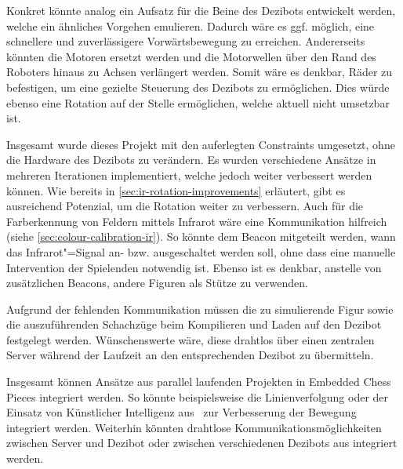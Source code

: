 
Konkret könnte analog ein Aufsatz für die Beine des Dezibots entwickelt werden, welche ein ähnliches Vorgehen emulieren. Dadurch wäre es ggf. möglich, eine schnellere und zuverlässigere Vorwärtsbewegung zu erreichen. Andererseits könnten die Motoren ersetzt werden und die Motorwellen über den Rand des Roboters hinaus zu Achsen verlängert werden. Somit wäre es denkbar, Räder zu befestigen, um eine gezielte Steuerung des Dezibots zu ermöglichen. Dies würde ebenso eine Rotation auf der Stelle ermöglichen, welche aktuell nicht umsetzbar ist.


Insgesamt wurde dieses Projekt mit den auferlegten Constraints umgesetzt, ohne die Hardware des Dezibots zu verändern. Es wurden verschiedene Ansätze in mehreren Iterationen implementiert, welche jedoch weiter verbessert werden können. Wie bereits in \autoref{sec:ir-rotation-improvements} erläutert, gibt es ausreichend Potenzial, um die Rotation weiter zu verbessern. Auch für die Farberkennung von Feldern mittels Infrarot wäre eine Kommunikation hilfreich (siehe \autoref{sec:colour-calibration-ir}). So könnte dem Beacon mitgeteilt werden, wann das Infrarot"=Signal an- bzw. ausgeschaltet werden soll, ohne dass eine manuelle Intervention der Spielenden notwendig ist. Ebenso ist es denkbar, anstelle von zusätzlichen Beacons, andere Figuren als Stütze zu verwenden.


Aufgrund der fehlenden Kommunikation müssen die zu simulierende Figur sowie die auszuführenden Schachzüge beim Kompilieren und Laden auf den Dezibot festgelegt werden. Wünschenswerte wäre, diese drahtlos über einen zentralen Server während der Laufzeit an den entsprechenden Dezibot zu übermitteln.


Insgesamt können Ansätze aus parallel laufenden Projekten in Embedded Chess Pieces integriert werden. So könnte beispielsweise die Linienverfolgung oder der Einsatz von Künstlicher Intelligenz aus~\cite{antonovSnskorpion2DezibotLabyrinthSolver2025} zur Verbesserung der Bewegung integriert werden. Weiterhin könnten drahtlose Kommunikationsmöglichkeiten zwischen Server und Dezibot oder zwischen verschiedenen Dezibots aus \mbox{\cite{bruderMoseschmiedelDezibot2025,dietrichTimDietrichDezibotlogging2025,richterCurvesHubDezibotDebugInterface2025}} integriert werden.
